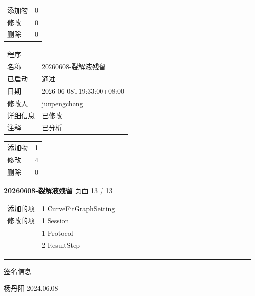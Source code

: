 \documentclass[UTF8,10pt,a4paper,fontset=fandol]{ctexart}
\newcommand{\fieldvalue}[1]{#1}
\newcommand{\handwritten}[1]{#1}
\begin{document}
\vspace{0.6em}
\begin{tabular}{@{}p{2.2cm}p{11.5cm}@{}}
添加物 & 0 \\
修改 & 0 \\
删除 & 0 \\
\end{tabular}

\vspace{0.8em}
\begin{tabular}{@{}p{2.2cm}p{11.5cm}@{}}
程序 & \\
名称 & 20260608-裂解液残留 \\
已启动 & 通过 \\
日期 & 2026-06-08T19:33:00+08:00 \\
修改人 & junpengchang \\
详细信息 & 已修改 \\
注释 & 已分析 \\
\end{tabular}

\vspace{0.6em}
\begin{tabular}{@{}p{2.2cm}p{11.5cm}@{}}
添加物 & 1 \\
修改 & 4 \\
删除 & 0 \\
\end{tabular}

\normalsize

\newpage

\textbf{20260608-裂解液残留} \hfill 页面 13 / 13

\medskip

\begin{tabular}{@{}ll@{}}
添加的项 & 1 \quad CurveFitGraphSetting \\[2pt]
修改的项 & 1 \quad Session \\
           & 1 \quad Protocol \\
           & 2 \quad ResultStep
\end{tabular}

\medskip
\hrule
\medskip

签名信息

\vfill

\fieldvalue{\handwritten{杨丹阳}}
\hspace{1em}
\fieldvalue{\handwritten{2024.06.08}}
\end{document}
